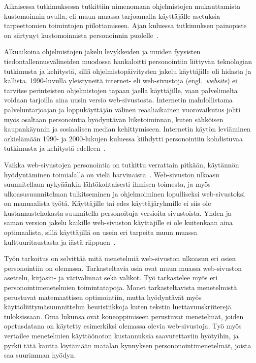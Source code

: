\documentclass[finnish, 12pt, a4paper, elec, utf8, a-1b, online]{aaltothesis}
\begin{document}
Aikaisessa tutkimuksessa tutkittiin nimenomaan ohjelmistojen mukauttamista
kustomoinnin avulla, eli muun muassa tarjoamalla käyttäjälle asetuksia
tarpeettomien toimintojen piilottamiseen. Ajan kuluessa tutkimuksen painopiste
on siirtynyt kustomoinnista personoinnin puolelle~\cite{viite?}.

Alkuaikoina ohjelmistojen jakelu levykkeiden ja muiden fyysisten
tiedontallennusvälineiden muodossa hankaloitti personointiin liittyvän
teknologian tutkimusta ja kehitystä, sillä ohjelmistopäivitysten jakelu
käyttäjille oli hidasta ja kallista. 1990-luvulla yleistyneitä internet- eli
web-sivustoja (engl.~\textit{website}) ei tarvitse perinteisten ohjelmistojen
tapaan jaella käyttäjille, vaan palvelimelta voidaan tarjoilla aina uusin versio
web-sivustosta. Internetin mahdollistama palveluntarjoajan ja loppukäyttäjän
välinen reaaliaikainen vuorovaikutus johti myös osaltaan personointia
hyödyntävän liiketoiminnan, kuten sähköisen kaupankäynnin ja sosiaalisen median
kehittymiseen. Internetin käytön leviäminen arkielämään 1990- ja 2000-lukujen
kuluessa kiihdytti personointiin kohdistuvaa tutkimusta ja kehitystä
edelleen~\cite{10.1108/03090560710737534}.

Vaikka web-sivustojen personointia on tutkittu verrattain pitkään, käytännön
hyödyntäminen toimialalla on vielä harvinaista~\cite{viite?}.
Web-sivuston ulkoasu suunnitellaan nykyäänkin lähtökohtaisesti ihmisen toimesta,
ja myös ulkoasusuunnitelman tulkitseminen ja ohjelmoiminen lopulliseksi
web-sivustoksi on manuaalista työtä. Käyttäjille tai edes käyttäjäryhmille ei
siis ole kustannustehokasta suunnitella personoituja versioita sivustoista.
Yhden ja saman version jakelu kaikille web-sivuston käyttäjille ei ole
kuitenkaan aina optimaalista, sillä käyttäjillä on usein eri tarpeita muun
muassa kulttuuritaustasta ja iästä riippuen~\cite{viite?}.

Työn tarkoitus on selvittää mitä menetelmiä web-sivuston ulkoasun eri osien
personointiin on olemassa. Tarkasteltavia osia ovat muun muassa web-sivuston
asettelu, kirjasin- ja värivalinnat sekä valikot. Työ tarkastelee myös eri
personointimenetelmien toimintatapoja. Monet tarkasteltavista menetelmistä
perustuvat matemaattisen optimointiin, mutta hyödyntävät myös
käyttöliittymäsuunnittelun heuristiikkoja kuten tekstin luettavuuskriiterejä
tuloksissaan. Oma lukunsa ovat koneoppimiseen perustuvat menetelmät, joiden
opetusdatana on käytetty esimerkiksi olemassa olevia web-sivustoja. Työ myös
vertailee menetelmien käyttöönoton kustannuksia saavutettaviin hyötyihin, ja
pyrkii tätä kautta löytämään matalan kynnyksen persononointimenetelmät, joista
saa suurimman hyödyn.
\end{document}
